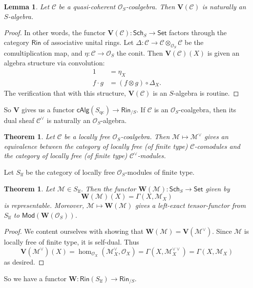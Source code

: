 \documentclass{article}
\newcommand{\bV}{\mathbf{V}}
\newcommand{\bW}{\mathbf{W}}
\newcommand{\sC}{\mathscr{C}}
\newcommand{\sM}{\mathscr{M}}
\newcommand{\sO}{\mathscr{O}}
\newcommand{\coalg}{\mathsf{cAlg}}
\newcommand{\lf}[1]{{#1}_\mathrm{lf}}
\newcommand{\module}{\mathsf{Mod}}
\newcommand{\qc}[1]{{#1}_\mathrm{qc}}
\newcommand{\ring}{\mathsf{Rin}}
\newcommand{\scheme}{\mathsf{Sch}}
\newcommand{\set}{\mathsf{Set}}
\newtheorem{lemma}[subsection]{Lemma}
\newtheorem{theorem}[subsection]{Theorem}
\begin{document}
\begin{lemma}
Let $\sC$ be a quasi-coherent $\sO_S$-coalgebra. Then $\bV(\sC)$ is naturally 
an $S$-algebra. 
\end{lemma}
\begin{proof}
In other words, the functor $\bV(\sC)\colon \scheme_S\to \set$ factors through 
the category $\ring$ of associative unital rings. Let 
$\Delta\colon \sC\to\sC\otimes_{\sO_S} \sC$ be the comultiplication map, and 
$\eta\colon\sC\to\sO_S$ the conit. Then $\bV(\sC)(X)$ is given an algebra 
structure via convolution: 
\begin{align*}
	1 &= \eta_X \\
	f\cdot g &= (f\otimes g)\circ\Delta_X .
\end{align*}
The verification that with this structure, $\bV(\sC)$ is an $S$-algebra is 
routine. 
\end{proof}

So $\bV$ gives us a functor $\coalg(\qc S)\to \ring_{/S}$. If $\sC$ is an 
$\sO_S$-coalgebra, then its dual sheaf $\sC^\vee$ is naturally an 
$\sO_S$-algebra. 

\begin{theorem}
Let $\sC$ be a locally free $\sO_S$-coalgebra. Then $\sM\mapsto \sM^\vee$ 
gives an equivalence between the category of locally free (of finite type) 
$\sC$-comodules and the category of locally free (of finite type) 
$\sC^\vee$-modules. 
\end{theorem}

Let $\lf S$ be the category of locally free $\sO_S$-modules of finite type. 

\begin{theorem}
Let $\sM\in \lf S$. Then the functor $\bW(\sM)\colon \scheme_S\to \set$ given 
by 
\[
	\bW(\sM)(X) = \Gamma(X,\sM_X) 
\]
is representable. Moreover, $\sM\mapsto \bW(\sM)$ gives a left-exact 
tensor-functor from $\lf S$ to $\module(\bW(\sO_S))$. 
\end{theorem}
\begin{proof}
We content ourselves with showing that $\bW(\sM)=\bV(\sM^\vee)$. Since 
$\sM$ is locally free of finite type, it is self-dual. Thus 
\[
	\bV(\sM^\vee)(X) = \hom_{\sO_X}(\sM_X^\vee,\sO_X) = \Gamma(X,\sM_X^{\vee\vee}) = \Gamma(X,\sM_X) 
\]
as desired. 
\end{proof}

So we have a functor $\bW\colon \ring(\lf S)\to \ring_{/S}$. 
\end{document}
